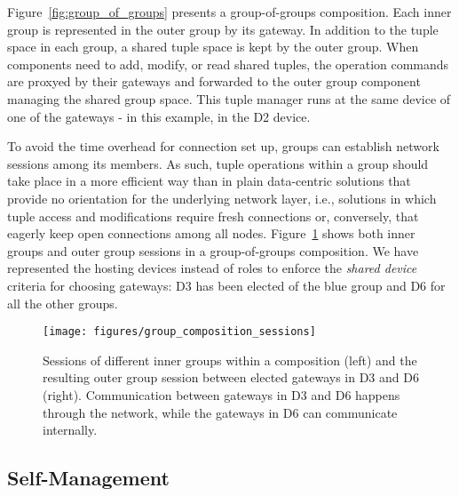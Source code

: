 Figure~\ref{fig:group_of_groups} presents a group-of-groups composition. Each inner group is represented in the outer group by its gateway. In addition to the tuple space in each group, a shared tuple space is kept by the outer group. When components need to add, modify, or read shared tuples, the operation commands are proxyed by their gateways and forwarded to the outer group component managing the shared group space. This tuple manager runs at the same device of one of the gateways - in this example, in the D2 device.

To avoid the time overhead for connection set up, groups can establish network sessions among its members. As such, tuple operations within a group should take place in a more efficient way than in plain data-centric solutions that provide no orientation for the underlying network layer, i.e., solutions in which tuple access and modifications require fresh connections or, conversely, that eagerly keep open connections among all nodes. Figure~\ref{fig:group_composition_sessions} shows both inner groups and outer group sessions in a group-of-groups composition. We have represented the hosting devices instead of roles to enforce the \textit{shared device} criteria for choosing gateways: D3 has been elected of the blue group and D6 for all the other groups.

\begin{figure}[ht!]
	\centering
	\texttt{[image: figures/group\_composition\_sessions]}
	\caption{Sessions of different inner groups within a composition (left) and the resulting outer group session between elected gateways in D3 and D6 (right). Communication between gateways in D3 and D6 happens through the network, while the gateways in D6 can communicate internally.}
	\label{fig:group_composition_sessions}
\end{figure}



\subsection{Self-Management}\label{sec:group_mangement}

